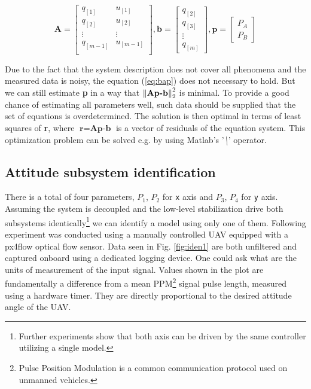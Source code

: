 \begin{equation}
\textbf{A} = \begin{bmatrix}
q_{[1]} & u_{[1]} \\
q_{[2]} & u_{[2]} \\
\vdots & \vdots \\
q_{[m-1]} & u_{[m-1]} \\
\end{bmatrix},
\textbf{b} = \begin{bmatrix}
q_{[2]} \\
q_{[3]} \\
\vdots\\
q_{[m]}
\end{bmatrix},
\textbf{p} = \begin{bmatrix}
P_A \\
P_B
\end{bmatrix}
\end{equation}

Due to the fact that the system description does not cover all phenomena and the measured data is noisy, the equation (\ref{eq:bap}) does not necessary to hold. But we can still estimate \textbf{p} in a way that $\left\lVert\textbf{Ap-b}\right\rVert_2^2$ is minimal. To provide a good chance of estimating all parameters well, such data should be supplied that the set of equations is overdetermined. The solution is then optimal in terms of least squares of \textbf{r}, where $\textbf{r} = \textbf{Ap-b}$ is a vector of residuals of the equation system. This optimization problem can be solved e.g. by using Matlab's '\textit{\textbackslash}' operator.

\subsection{Attitude subsystem identification}
\label{cap:attitude_subsystem_identification}

There is a total of four parameters, $P_1$, $P_2$ for \texttt{x} axis and $P_3$, $P_4$ for \texttt{y} axis. Assuming the system is decoupled and the low-level stabilization drive both subsystems identically\footnote{Further experiments show that both axis can be driven by the same controller utilizing a single model.} we can identify a model using only one of them. Following experiment was conducted using a manually controlled UAV equipped with a px4flow optical flow sensor. Data seen in Fig. \ref{fig:iden1} are both unfiltered and captured onboard using a dedicated logging device. One could ask what are the units of measurement of the input signal. Values shown in the plot are fundamentally a difference from a mean PPM\footnote{Pulse Position Modulation is a common communication protocol used on unmanned vehicles.} signal pulse length, measured using a hardware timer. They are directly proportional to the desired attitude angle of the UAV.

